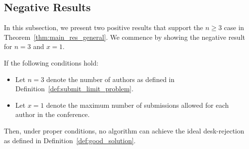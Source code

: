 \subsection{Negative Results} \label{sec:negative_results}
In this subsection, we present two positive results that support the $n \ge 3$ case in Theorem~\ref{thm:main_res_general}. We commence by showing the negative result for $n = 3$ and $x=1$.

\begin{lemma}[Negative result for $n=3$ and $x=1$] \label{lem:n_eq_3_negative}
If the following conditions hold:
\begin{itemize}
    \item Let $n = 3$ denote the number of authors as defined in Definition~\ref{def:submit_limit_problem}.
    \item Let $x=1$ denote the maximum number of submissions allowed for each author in the conference. 
\end{itemize}

Then, under proper conditions, no algorithm can achieve the ideal desk-rejection as defined
in Definition~\ref{def:good_solution}.
\end{lemma}

